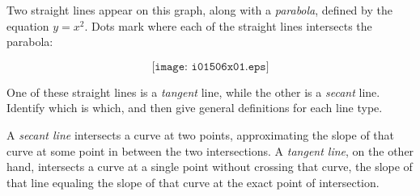 

Two straight lines appear on this graph, along with a {\it parabola}, defined by the equation $y = x^2$.  Dots mark where each of the straight lines intersects the parabola:

$$\texttt{[image: i01506x01.eps]}$$

One of these straight lines is a {\it tangent} line, while the other is a {\it secant} line.  Identify which is which, and then give general definitions for each line type.







A {\it secant line} intersects a curve at two points, approximating the slope of that curve at some point in between the two intersections.  A {\it tangent line}, on the other hand, intersects a curve at a single point without crossing that curve, the slope of that line equaling the slope of that curve at the exact point of intersection.











